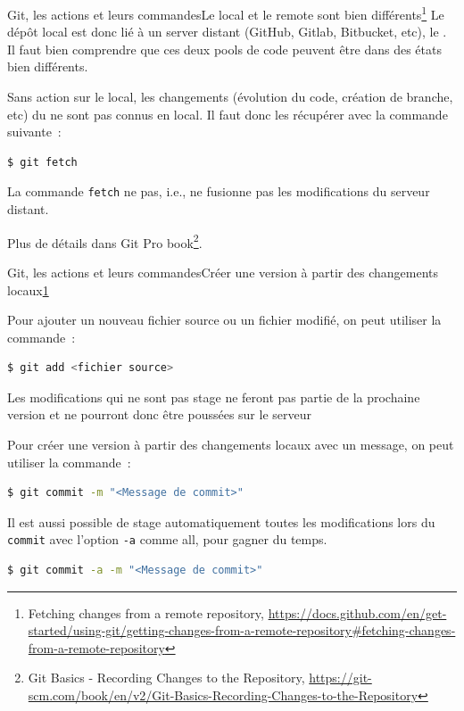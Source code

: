 \documentclass{beamer}
\begin{document}
    \begin{frame}[fragile]{Git, les actions et leurs commandes}{Le local et le remote sont bien différents\footnote{\label{progitfetch}Fetching changes from a remote repository, \url{https://docs.github.com/en/get-started/using-git/getting-changes-from-a-remote-repository\#fetching-changes-from-a-remote-repository}}}
        \transdissolve
        Le dépôt local est donc lié à un server distant (GitHub, Gitlab, Bitbucket, etc), le .
        Il faut bien comprendre que ces deux pools de code peuvent être dans des états bien différents.

        Sans action sur le local, les changements (évolution du code, création de branche, etc) du  ne sont pas connus en local.
        Il faut donc les récupérer avec la commande suivante~:
        \begin{lstlisting}[language=sh]
$ git fetch
        \end{lstlisting}
        La commande \lstinline{fetch} ne  pas, i.e., ne fusionne pas les modifications du serveur distant.

        Plus de détails dans Git Pro book\footnote{Git Basics - Recording Changes to the Repository, \url{https://git-scm.com/book/en/v2/Git-Basics-Recording-Changes-to-the-Repository}}.

    \end{frame}


    \begin{frame}[fragile]{Git, les actions et leurs commandes}{Créer une version à partir des changements locaux\cref{progitfetch}}
        \transdissolve

        Pour ajouter un nouveau fichier source ou  un fichier modifié, on peut utiliser la commande~:
        \begin{lstlisting}[language=sh]
$ git add <fichier source>
        \end{lstlisting}

        Les modifications qui ne sont pas stage ne feront pas partie de la prochaine version et ne pourront donc être poussées sur le serveur


        Pour créer une version à partir des changements locaux avec un message, on peut utiliser la commande~:

        \begin{lstlisting}[language=sh]
$ git commit -m "<Message de commit>"
        \end{lstlisting}

        Il est aussi possible de stage automatiquement toutes les modifications lors du \lstinline{commit} avec l'option \lstinline{-a} comme all, pour gagner du temps.

        \begin{lstlisting}[language=sh]
$ git commit -a -m "<Message de commit>"
        \end{lstlisting}
    \end{frame}
\end{document}
